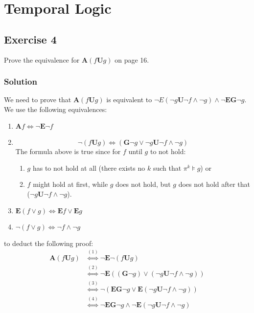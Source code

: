 \documentclass[a4paper, 12pt]{article}
\newcommand{\codeinput}[1]
{
    \begin{leftbar}
        {\fontsize{9pt}{11pt}}
    \end{leftbar}
}
\begin{document}
\codeinput{bdd_to_formula}

\section{Temporal Logic}

\subsection{Exercise 4}

Prove the equivalence for $\mathbf{A}(f \mathbf{U} g)$ on page 16.

\subsubsection{Solution}

We need to prove that $\mathbf{A}(f \mathbf{U} g)$ is equivalent to $¬E(¬g
\mathbf{U} ¬f ∧ ¬g) ∧ ¬\mathbf{EG} ¬g$. We use the following equivalences:

\begin{enumerate}[(1)]
    \item $\mathbf{A} f ⇔ ¬\mathbf{E}¬f$
    \item

    \[ ¬(f \mathbf{U} g) ⇔ (\mathbf{G}¬g ∨ ¬g \mathbf{U} ¬f ∧ ¬g) \]
    The formula above is true since for $f$ until $g$ to not hold:
        \begin{enumerate}

            \item $g$ has to not hold at all (there exists no $k$ such that
            $π^k⊧g$) or

            \item $f$ might hold at first, while $g$ does not hold, but $g$
            does not hold after that ($¬g \mathbf{U} ¬f ∧ ¬g$).

        \end{enumerate}

    \item $\mathbf{E}(f ∨ g) ⇔ \mathbf{E}f ∨ \mathbf{E}g$
    \item $¬ (f ∨ g) ⇔ ¬f ∧ ¬g$
\end{enumerate}

to deduct the following proof:
\begin{align*}
    \mathbf{A}\left(f \mathbf{U} g\right)
    & \stackrel{(1)}{⇔} ¬\mathbf{E} ¬\left(f\mathbf{U} g\right)\\
    & \stackrel{(2)}{⇔} ¬\mathbf{E} \left(\left(\mathbf{G}¬g\right) ∨
      \left(¬g\mathbf{U} ¬f ∧ ¬g\right)\right)\\
    & \stackrel{(3)}{⇔} ¬\left(\mathbf{EG}¬g ∨
      \mathbf{E}\left(¬g\mathbf{U} ¬f ∧ ¬g\right)\right)\\
    & \stackrel{(4)}{⇔} ¬\mathbf{EG}¬g ∧ ¬\mathbf{E}\left(¬g\mathbf{U} ¬f ∧
      ¬g\right)\\
\end{align*}
\end{document}
